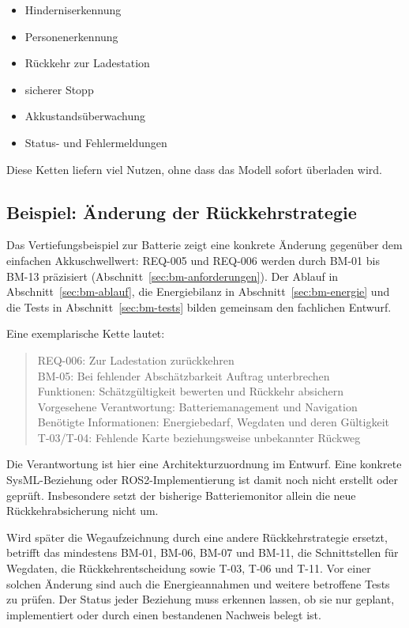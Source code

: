 \begin{itemize}
    \item Hinderniserkennung
    \item Personenerkennung
    \item Rückkehr zur Ladestation
    \item sicherer Stopp
    \item Akkustandsüberwachung
    \item Status- und Fehlermeldungen
\end{itemize}

Diese Ketten liefern viel Nutzen, ohne dass das Modell sofort überladen wird.

\subsection{Beispiel: Änderung der Rückkehrstrategie}
Das Vertiefungsbeispiel zur Batterie zeigt eine konkrete Änderung gegenüber dem einfachen Akkuschwellwert: REQ-005 und REQ-006 werden durch BM-01 bis BM-13 präzisiert (Abschnitt~\ref{sec:bm-anforderungen}). Der Ablauf in Abschnitt~\ref{sec:bm-ablauf}, die Energiebilanz in Abschnitt~\ref{sec:bm-energie} und die Tests in Abschnitt~\ref{sec:bm-tests} bilden gemeinsam den fachlichen Entwurf.

Eine exemplarische Kette lautet:
\begin{quote}
REQ-006: Zur Ladestation zurückkehren\\
BM-05: Bei fehlender Abschätzbarkeit Auftrag unterbrechen\\
Funktionen: Schätzgültigkeit bewerten und Rückkehr absichern\\
Vorgesehene Verantwortung: Batteriemanagement und Navigation\\
Benötigte Informationen: Energiebedarf, Wegdaten und deren Gültigkeit\\
T-03/T-04: Fehlende Karte beziehungsweise unbekannter Rückweg
\end{quote}

Die Verantwortung ist hier eine Architekturzuordnung im Entwurf. Eine konkrete SysML-Beziehung oder ROS2-Implementierung ist damit noch nicht erstellt oder geprüft. Insbesondere setzt der bisherige Batteriemonitor allein die neue Rückkehrabsicherung nicht um.

Wird später die Wegaufzeichnung durch eine andere Rückkehrstrategie ersetzt, betrifft das mindestens BM-01, BM-06, BM-07 und BM-11, die Schnittstellen für Wegdaten, die Rückkehrentscheidung sowie T-03, T-06 und T-11. Vor einer solchen Änderung sind auch die Energieannahmen und weitere betroffene Tests zu prüfen. Der Status jeder Beziehung muss erkennen lassen, ob sie nur geplant, implementiert oder durch einen bestandenen Nachweis belegt ist.

